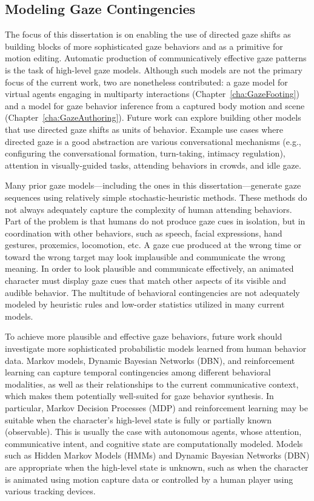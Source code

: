 \subsection{Modeling Gaze Contingencies}

The focus of this dissertation is on enabling the use of directed gaze shifts as building blocks of more sophisticated gaze behaviors and as a primitive for motion editing. Automatic production of communicatively effective gaze patterns is the task of high-level gaze models. Although such models are not the primary focus of the current work, two are nonetheless contributed: a gaze model for virtual agents engaging in multiparty interactions (Chapter~\ref{cha:GazeFooting}) and a model for gaze behavior inference from a captured body motion and scene (Chapter~\ref{cha:GazeAuthoring}). Future work can explore building other models that use directed gaze shifts as units of behavior. Example use cases where directed gaze is a good abstraction are various conversational mechanisms (e.g., configuring the conversational formation, turn-taking, intimacy regulation), attention in visually-guided tasks, attending behaviors in crowds, and idle gaze.

Many prior gaze models---including the ones in this dissertation---generate gaze sequences using relatively simple stochastic-heuristic methods. These methods do not always adequately capture the complexity of human attending behaviors. Part of the problem is that humans do not produce gaze cues in isolation, but in coordination with other behaviors, such as speech, facial expressions, hand gestures, proxemics, locomotion, etc. A gaze cue produced at the wrong time or toward the wrong target may look implausible and communicate the wrong meaning. In order to look plausible and communicate effectively, an animated character must display gaze cues that match other aspects of its visible and audible behavior. The multitude of behavioral contingencies are not adequately modeled by heuristic rules and low-order statistics utilized in many current models.

To achieve more plausible and effective gaze behaviors, future work should investigate more sophisticated probabilistic models learned from human behavior data. Markov models, Dynamic Bayesian Networks (DBN), and reinforcement learning can capture temporal contingencies among different behavioral modalities, as well as their relationships to the current communicative context, which makes them potentially well-suited for gaze behavior synthesis. In particular, Markov Decision Processes (MDP) and reinforcement learning may be suitable when the character's high-level state is fully or partially known (observable). This is usually the case with autonomous agents, whose attention, communicative intent, and cognitive state are computationally modeled. Models such as Hidden Markov Models (HMMs) and Dynamic Bayesian Networks (DBN) are appropriate when the high-level state is unknown, such as when the character is animated using motion capture data or controlled by a human player using various tracking devices.

